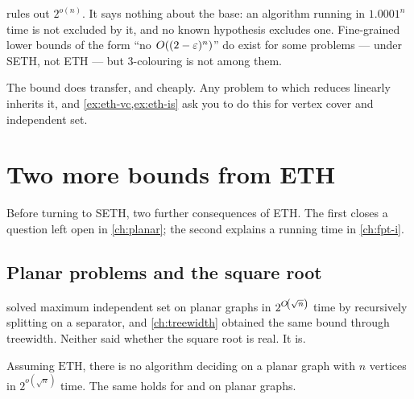 \begin{remark}\label{rem:eth-3col-scope}
 rules out $2^{o(n)}$. It says nothing about the base: an
algorithm running in $1.0001^n$ time is not excluded by it, and no known
hypothesis excludes one. Fine-grained lower bounds of the form ``no
$O\!\left((2-\varepsilon)^n\right)$'' do exist for some problems --- under SETH, not
ETH --- but $3$-colouring is not among them.

The bound does transfer, and cheaply. Any problem to which 
reduces linearly inherits it, and \cref{ex:eth-vc,ex:eth-is} ask you to do
this for vertex cover and independent set.
\end{remark}

\section{Two more bounds from ETH}
\label{sec:eth-more}

Before turning to SETH, two further consequences of ETH. The first closes a
question left open in \cref{ch:planar}; the second explains a
running time in \cref{ch:fpt-i}.

\subsection{Planar problems and the square root}

 solved maximum independent set on planar graphs in
$2^{O\!\left(\sqrt n\right)}$ time by recursively splitting on a separator, and
\cref{ch:treewidth} obtained the same bound through treewidth. Neither said
whether the square root is real. It is.

\begin{theorem}\label{thm:eth-planar}
Assuming $\mathrm{ETH}$, there is no algorithm deciding  on a planar graph with $n$ vertices in $2^{o(\sqrt n)}$ time. The
same holds for  and  on planar
graphs.
\end{theorem}

